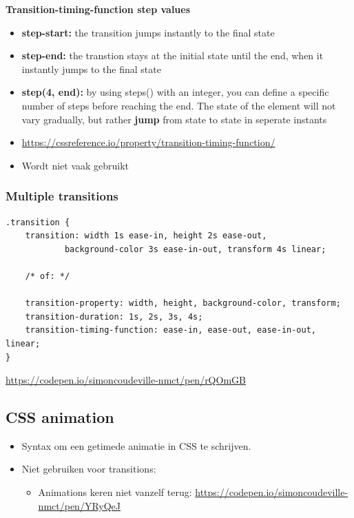 \documentclass{article}
\newcommand{\bold}[1]{\textbf{#1}}
\begin{document}
\bold{Transition-timing-function step values}

\begin{itemize}
    \item \bold{step-start:} the transition jumps instantly to the final state
    \item \bold{step-end:} the transtion stays at the initial state until the end, when it instantly jumps to the final state
    \item \bold{step(4, end):} by using steps() with an integer, you can define a specific number of steps before reaching the end.
    The state of the element will not vary gradually, but rather \bold{jump} from state to state in seperate instants
    \item \url{https://cssreference.io/property/transition-timing-function/}
    \item Wordt niet vaak gebruikt
\end{itemize}

\subsubsection{Multiple transitions}
\begin{verbatim}
.transition {
    transition: width 1s ease-in, height 2s ease-out, 
            background-color 3s ease-in-out, transform 4s linear;

    /* of: */

    transition-property: width, height, background-color, transform;
    transition-duration: 1s, 2s, 3s, 4s;
    transition-timing-function: ease-in, ease-out, ease-in-out, linear;
}
\end{verbatim}

\url{https://codepen.io/simoncoudeville-nmct/pen/rQOmGB}

\subsection{CSS animation}
\begin{itemize}
    \item Syntax om een getimede animatie in CSS te schrijven.
    \item Niet gebruiken voor transitions:
    \begin{itemize}
        \item Animations keren niet vanzelf terug: \url{https://codepen.io/simoncoudeville-nmct/pen/YRyQeJ}
    \end{itemize}
\end{itemize}
\end{document}
